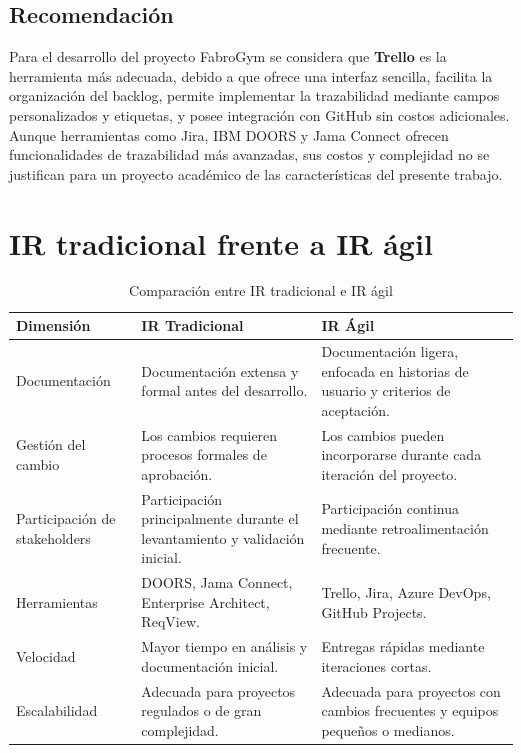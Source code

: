 \documentclass[11pt,a4paper]{article}
\begin{document}
\subsection*{Recomendación}

Para el desarrollo del proyecto FabroGym se considera que \textbf{Trello} es la herramienta más adecuada, debido a que ofrece una interfaz sencilla, facilita la organización del backlog, permite implementar la trazabilidad mediante campos personalizados y etiquetas, y posee integración con GitHub sin costos adicionales. Aunque herramientas como Jira, IBM DOORS y Jama Connect ofrecen funcionalidades de trazabilidad más avanzadas, sus costos y complejidad no se justifican para un proyecto académico de las características del presente trabajo.

\section{IR tradicional frente a IR ágil}

\begin{table}[H]
\centering
\renewcommand{\arraystretch}{1.3}
\caption{Comparación entre IR tradicional e IR ágil}
\label{tab:tradicionalAgil}
\begin{tabularx}{\textwidth}{|L{3.3cm}|Y|Y|}
\hline
\textbf{Dimensión} & \textbf{IR Tradicional} & \textbf{IR Ágil} \\ \hline
Documentación & Documentación extensa y formal antes del desarrollo. & Documentación ligera, enfocada en historias de usuario y criterios de aceptación. \\ \hline
Gestión del cambio & Los cambios requieren procesos formales de aprobación. & Los cambios pueden incorporarse durante cada iteración del proyecto. \\ \hline
Participación de stakeholders & Participación principalmente durante el levantamiento y validación inicial. & Participación continua mediante retroalimentación frecuente. \\ \hline
Herramientas & DOORS, Jama Connect, Enterprise Architect, ReqView. & Trello, Jira, Azure DevOps, GitHub Projects. \\ \hline
Velocidad & Mayor tiempo en análisis y documentación inicial. & Entregas rápidas mediante iteraciones cortas. \\ \hline
Escalabilidad & Adecuada para proyectos regulados o de gran complejidad. & Adecuada para proyectos con cambios frecuentes y equipos pequeños o medianos. \\ \hline
\end{tabularx}
\end{table}
\end{document}
